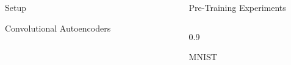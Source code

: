 \documentclass[final]{beamer}
\newlength{\sepwid}
\newlength{\onecolwid}
\newlength{\threecolwid}
\begin{document}
\begin{frame}[t]
\begin{columns}[t]
\begin{column}{\onecolwid}
\begin{alertblock}{Setup}
\begin{block}{Convolutional Autoencoders}
\end{block}

\end{alertblock}



\end{column} %


\begin{column}{\sepwid}\end{column} %


\begin{column}{\threecolwid}


\begin{alertblock}{Pre-Training Experiments}

\centering

\begin{columns}[t, totalwidth=0.9\threecolwid] %




\begin{column}{0.9\onecolwid} %
\begin{block}{MNIST}

\begin{figure}


\end{figure}
\end{block}
\end{column}
\end{columns}
\end{alertblock}
\end{column}
\end{columns}
\end{frame}
\end{document}
